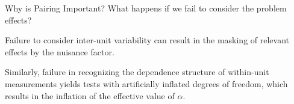 
\begin{frame}[fragile]{Why is Pairing Important?}
What happens if we fail to consider the problem effects?
{}
\bigskip

Failure to consider inter-unit variability can result in the masking of relevant effects by the nuisance factor.
\bigskip

Similarly, failure in recognizing the dependence structure of within-unit measurements yields tests with artificially inflated degrees of freedom, which results in the inflation of the effective value of $\alpha$.
\end{frame}


